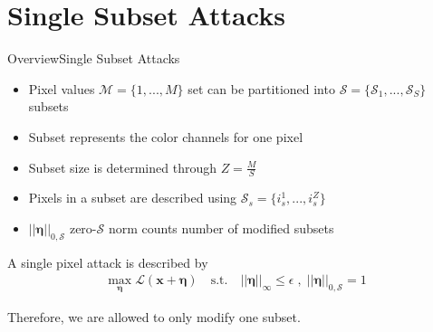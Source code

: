 \documentclass[xcolor={cmyk}]{beamer}
\newcommand{\mcl}{\mathcal}
\newcommand{\bm}{\boldsymbol}
\begin{document}
\section{Single Subset Attacks}
\begin{frame}{Overview}{Single Subset Attacks}

	\begin{itemize}
		\item Pixel values $\mcl{M} = \{1, ..., M\}$ set can be partitioned into $\mcl{S} = \{\mcl{S}_1, ..., \mcl{S}_S\}$ subsets
		\item Subset represents the color channels for one pixel
		\item Subset size is determined through $Z = \frac{M}{S}$
		\item Pixels in a subset are described using $\mcl{S}_s = \{i^1_s, ..., i^Z_s\}$
		\item $\lvert\lvert \bm{\eta} \rvert\rvert_{0, \mcl{S}}$ zero-$\mcl{S}$ norm counts number of modified subsets\\[10pt]
	\end{itemize}

	A single pixel attack is described by\\[10pt]

	\begin{equation*}
	\begin{aligned}
		\max_{\bm{\eta}} \mcl{L}(\bm{x} + \bm{\eta}) \quad \text{s.t.} \quad \lvert\lvert \bm{\eta} \rvert\rvert_{\infty} \leq \epsilon \;, \; \lvert\lvert \bm{\eta} \rvert\rvert_{0, \mcl{S}} = 1
	\end{aligned}
	\label{singlesubsetgeneral}
	\end{equation*}

	Therefore, we are allowed to only modify one subset.
\end{frame}
\end{document}
